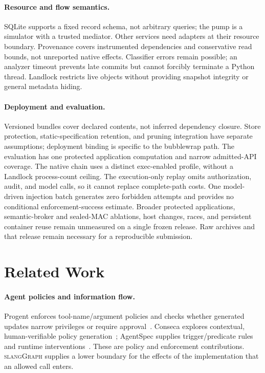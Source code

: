 \documentclass[letterpaper,twocolumn,10pt]{article}
\newcommand{\sys}{\textsc{slangGraph}\xspace}
\begin{document}
\paragraph{Resource and flow semantics.}
SQLite supports a fixed record schema, not arbitrary queries; the pump is a
simulator with a trusted mediator. Other services need adapters at their resource
boundary. Provenance covers instrumented dependencies and conservative read
bounds, not unreported native effects. Classifier errors remain possible;
an analyzer timeout prevents late commits but cannot forcibly terminate a
Python thread. Landlock restricts live objects without providing snapshot
integrity or general metadata hiding.

\paragraph{Deployment and evaluation.}
Versioned bundles cover declared contents, not inferred dependency closure.
Store protection, static-specification retention, and pruning integration have
separate assumptions; deployment binding is specific to the bubblewrap path.
The evaluation has one protected application computation and narrow admitted-API
coverage. The native chain uses a distinct exec-enabled profile, without a
Landlock process-count ceiling. The execution-only replay omits authorization,
audit, and model calls, so it cannot replace complete-path costs.
One model-driven injection batch generates zero forbidden attempts and provides
no conditional enforcement-success estimate. Broader protected applications,
semantic-broker and sealed-MAC ablations, host changes, races, and persistent
container reuse remain unmeasured on a single frozen release. Raw archives and
that release remain necessary for a reproducible submission.

\section{Related Work}

\paragraph{Agent policies and information flow.}
Progent enforces tool-name/argument policies and checks whether generated
updates narrow privileges or require approval~\cite{progent}. Conseca explores
contextual, human-verifiable policy generation~\cite{conseca}; AgentSpec supplies
trigger/predicate rules and runtime interventions~\cite{agentspec}. These are
policy and enforcement contributions. \sys supplies a lower boundary for the
effects of the implementation that an allowed call enters.
\end{document}
